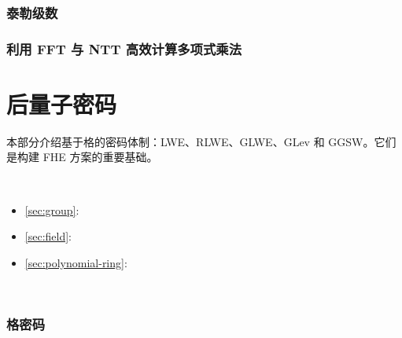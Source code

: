 \documentclass[11pt]{article}
\begin{document}
\clearpage

\section{泰勒级数}
\label{sec:taylor-series}


\clearpage



\section{利用 FFT 与 NTT 高效计算多项式乘法}
\label{sec:ntt}


\clearpage





\part{后量子密码}
\label{part:pqc}

\renewcommand{\thesection}{B-\arabic{section}}
\setcounter{section}{0}

本部分介绍基于格的密码体制：LWE、RLWE、GLWE、GLev 和 GGSW。它们是构建 FHE 方案的重要基础。


$ $

\begin{tcolorbox}[
    title = \textbf{所需背景知识},    %
    colback = white,    %
    colframe = black,  %
    boxrule = 0.8pt,     %
    left = 1mm, right = 1mm, top = 1mm, bottom = 1mm %
]



\begin{itemize}
\item \autoref{sec:group}: 
\item \autoref{sec:field}: 
\item \autoref{sec:polynomial-ring}: 
\end{itemize}

\end{tcolorbox}

$ $

\clearpage

\section{格密码}
\label{sec:lattice}

\end{document}
